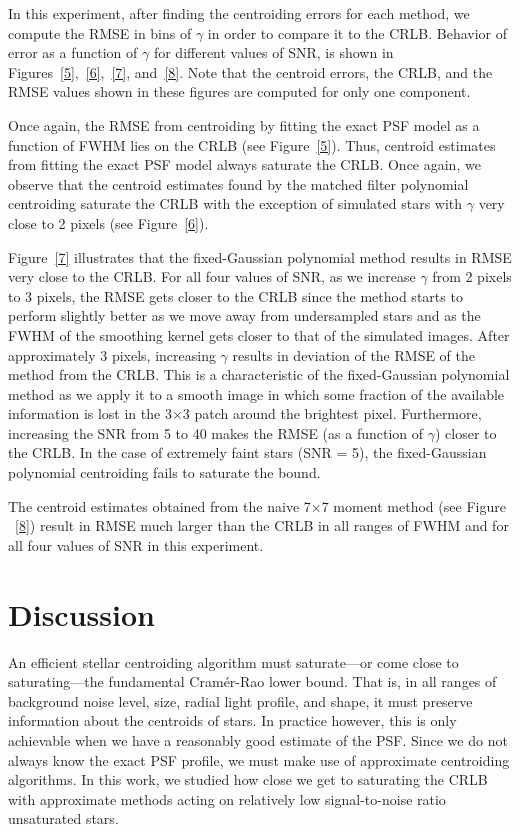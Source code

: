 In this experiment, after finding the centroiding errors for each method, we
compute the RMSE in bins of $\gamma$ in order to compare it to the CRLB. 
Behavior of error as a function of $\gamma$ for different values of SNR,
is shown in Figures~\ref{5},~\ref{6},~\ref{7}, and~\ref{8}. Note that the centroid errors, the CRLB, and the RMSE values shown in these figures are computed for only one component.
 
Once again, the RMSE from centroiding by fitting the exact PSF model as a function of FWHM lies on the CRLB (see Figure~\ref{5}). 
Thus, centroid estimates from fitting the exact PSF model always saturate the CRLB. Once again, we observe that the centroid estimates found by the matched filter polynomial centroiding saturate the CRLB with the
exception of simulated stars with $\gamma$ very close to 2 pixels (see Figure~\ref{6}).

Figure~\ref{7} illustrates that the fixed-Gaussian polynomial method results in RMSE very close to the CRLB. For all four values of SNR, as we increase $\gamma$ from 2 pixels to 3 pixels, the RMSE gets closer to the CRLB since the method starts to perform
slightly better as we move away from undersampled stars and as the FWHM of the smoothing kernel gets closer to that of the simulated images.
After approximately 3 pixels, increasing $\gamma$ results in deviation of the RMSE of the method from the CRLB. This is a characteristic of the fixed-Gaussian polynomial method as we apply it to a smooth image in which some fraction of the available information is lost in the 3$\times$3 patch around the brightest pixel. Furthermore, increasing the SNR from 5 to 40 makes the RMSE (as a function of $\gamma$) closer to the CRLB. 
In the case of extremely faint stars (SNR = 5), the fixed-Gaussian polynomial centroiding fails to saturate the bound.

The centroid estimates obtained from the naive 7$\times$7 moment method (see Figure ~\ref{8}) result in RMSE much larger than the CRLB in all ranges of FWHM and for all four values of SNR in this experiment. 

\section{Discussion}\label{sec:cdiscussion}

An efficient stellar centroiding algorithm must saturate---or come close to saturating---the fundamental 
Cram\'{e}r-Rao lower bound. That is, in all ranges of background noise level, size, radial light profile,
and shape, it must preserve information about the centroids of stars. In practice however,
this is only achievable when we have a reasonably good estimate of the PSF. Since we do not always 
know the exact PSF profile, we must make use of approximate centroiding algorithms. In this work, we
studied how close we get to saturating the CRLB with approximate methods acting on relatively low 
signal-to-noise ratio unsaturated stars.
 
